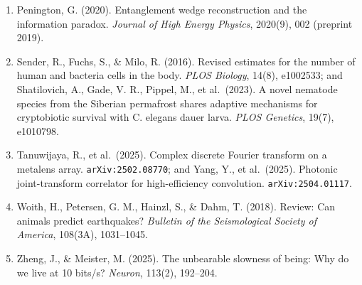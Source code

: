 \documentclass[10pt,letterpaper]{article}
\begin{document}
\begin{enumerate}
  Compilation {[}same house{]}. \url{https://research.openie.dev/}
\item
  Penington, G. (2020). Entanglement wedge reconstruction and the
  information paradox. \emph{Journal of High Energy Physics}, 2020(9),
  002 (preprint 2019).
\item
  Sender, R., Fuchs, S., \& Milo, R. (2016). Revised estimates for the
  number of human and bacteria cells in the body. \emph{PLOS Biology},
  14(8), e1002533; and Shatilovich, A., Gade, V. R., Pippel, M., et
  al.~(2023). A novel nematode species from the Siberian permafrost
  shares adaptive mechanisms for cryptobiotic survival with C. elegans
  dauer larva. \emph{PLOS Genetics}, 19(7), e1010798.
\item
  Tanuwijaya, R., et al.~(2025). Complex discrete Fourier transform on a
  metalens array. \texttt{arXiv:2502.\allowbreak{}08770}; and Yang, Y., et
  al.~(2025). Photonic joint-transform correlator for high-efficiency
  convolution. \texttt{arXiv:2504.\allowbreak{}01117}.
\item
  Woith, H., Petersen, G. M., Hainzl, S., \& Dahm, T. (2018). Review:
  Can animals predict earthquakes? \emph{Bulletin of the Seismological
  Society of America}, 108(3A), 1031--1045.
\item
  Zheng, J., \& Meister, M. (2025). The unbearable slowness of being:
  Why do we live at 10 bits/s? \emph{Neuron}, 113(2), 192--204.
\end{enumerate}
\end{document}
